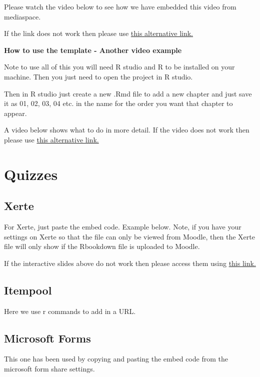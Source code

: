 \documentclass[
  letterpaper,
  oneside]{book}
\numberwithin{equation}{section}
\numberwithin{figure}{section}
\theoremstyle{break}
\theoremstyle{plain}
\theoremstyle{remark}
\begin{document}
Please watch the video below to see how we have embedded this video from
mediaspace.

If the link does not work then please use
\href{https://mediaspace.nottingham.ac.uk/media/How+to+get+the+embed+links/1_824b1mfn}{this
alternative link.}

\textbf{How to use the template - Another video example}

Note to use all of this you will need R studio and R to be installed on
your machine. Then you just need to open the project in R studio.

Then in R studio just create a new .Rmd file to add a new chapter and
just save it as 01, 02, 03, 04 etc. in the name for the order you want
that chapter to appear.

A video below shows what to do in more detail. If the video does not
work then please use
\href{https://mediaspace.nottingham.ac.uk/media/How+to+use+the+template/1_brjfqb44}{this
alternative link.}

\section{Quizzes}\label{quizzes}

\subsection{Xerte}\label{xerte}

For Xerte, just paste the embed code. Example below. Note, if you have
your settings on Xerte so that the file can only be viewed from Moodle,
then the Xerte file will only show if the Rbookdown file is uploaded to
Moodle.

If the interactive slides above do not work then please access them
using \href{https://www.nottingham.ac.uk/toolkits/play_25775}{this
link.}

\subsection{Itempool}\label{itempool}

Here we use r commands to add in a URL.

\subsection{Microsoft Forms}\label{microsoft-forms}

This one has been used by copying and pasting the embed code from the
microsoft form share settings.
\end{document}
